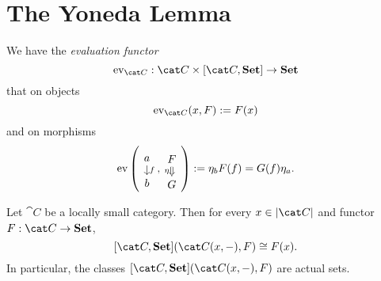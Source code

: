 
\section{The Yoneda Lemma}



We have the {\em evaluation functor}
\[\ev_{\cat C} : \cat C \times [\cat C, \Set] \to \Set\]
that on objects
\[\ev_{\cat C}(x, F) := F(x)\]
and on morphisms
\[\ev\left(\begin{tikzcd}[row sep=small] a \ar["f", d] \\ b \end{tikzcd}, \begin{tikzcd}[row sep=small] F \ar["\eta", d, swap, Rightarrow] \\ G \end{tikzcd}\right) := \eta_b F(f) = G(f) \eta_a .\]

\begin{lemma}\label{lemma:YonedaLemmaLemma}
Let \(\cat C\) be a locally small category. Then for every \(x \in \obj{\cat C}\) and functor \(F : \cat C \to \Set\),
\[[\cat C, \Set](\cat C(x, -), F) \cong F(x) .\]
In particular, the classes \([\cat C, \Set](\cat C(x, -), F)\) are  actual sets.
\end{lemma}

